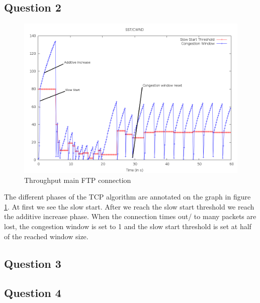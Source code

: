 \documentclass[11pt,a4paper]{article}
\begin{document}
\subsection{Question 2}
\begin{figure}[h!]
 \centering
 \includegraphics[width = 0.9\linewidth]{./ex2-part1-cwnd-sst.png}
 \caption{Throughput main FTP connection}
 \label{fig:Q22}
\end{figure}
The different phases of the TCP algorithm are annotated on the graph in figure \ref{fig:Q22}.
At first we see the slow start. After we reach the slow start threshold we reach the additive increase phase. When the connection times out/ to many packets are lost, the congestion window is set
to 1 and the slow start threshold is set at half of the reached window size.

\subsection{Question 3}

\subsection{Question 4}
\end{document}
